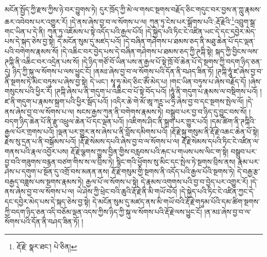 མངོན་སྤྱོད་ཀྱི་རྫས་ཀྱིས་ཉེ་བར་བྱུགས་ཏེ། དུར་ཁྲོད་ཀྱི་མེ་ལ་གསང་སྔགས་བརྗོད་ཅིང་གདུང་བར་བྱས་ན་ཀླུ་རྣམས་ཆར་འབེབས་པར་འགྱུར་རོ། །དེ་ནས་ཞེས་བྱ་བ་ལ་སོགས་པ་ལ། ཀུན་ཏུ་ངེས་པར་སྒྲོགས་པའི་:རྡོ་རྗེའི་\footnote{རྡོ་རྗེ་  སྣར་ཐང་།  པེ་ཅིན། }འབྲུག་སྒྲ་གང་ཡིན་པ་དེ་ནི། ཀུན་ཏུ་འཇོམས་པ་སྟེ་འདོད་པའི་རྒྱལ་པོའོ། །དེ་སྐྱེད་པའི་ཏིང་ངེ་འཛིན་ཡང་དེ་དང་དབྱེར་མེད་པས་དེ་སྐད་ཅེས་བྱ་སྟེ། དེ་མངོན་སུམ་དུ་མཛད་པའོ། །དེ་བཞིན་གཤེགས་པ་ཐམས་ཅད་ནི་མཐུ་ཆེན་པོ་དང་ལྡན་པའི་བགེགས་རྣམས་སོ། །དེ་འཆིང་བར་བྱེད་པས་དེ་བཞིན་གཤེགས་པ་ཐམས་ཅད་ཀྱི་ཊཀྐི་སྟེ། སྐད་ཀྱི་བྱིངས་ལས་ཊཀྐི་ནི་འཆིང་བར་འདྲེན་པས་སོ། །དེ་ཉིད་གཙོ་བོ་ཡིན་པས་ན་རྒྱལ་པོ་སྟེ་ཁྲོ་བོ་ཆེན་པོ་དེ་སྔགས་ཀྱི་བདག་ཉིད་ཅན་དུ། ཉིད་ཀྱི་སྐུ་ལ་སོགས་པ་ལས་ཕྱུང་ངོ། །ནམཿ་ཞེས་བྱ་བ་ལ་སོགས་པའི་དོན་ནི་བཤད་ཟིན་ཏོ། །ཊཀྐི་ཧཱུཾ་ཛ་ཞེས་བྱ་བ་ནི་སྔགས་ཏེ་མིང་བཏུས་པ་ཞེས་བྱ་སྟེ། དེ་ཡང་། སྭཱ་ཧཱ་མེད་ཅིང་ཨོཾ་མེད་པ། །གང་ཡིན་བཏུས་པ་ཞེས་བརྗོད་དོ། །ཞེས་གསུངས་པའི་ཕྱིར་རོ། །ཊཀྐི་ཞེས་པ་ནི་གདུག་པ་འཆིང་བ་པོ་སྟེ་བོད་པའོ། །ཧཱུཾ་ནི་གདུག་པ་རྣམས་ལ་བསྡིགས་པའོ། །ཛ་ནི་གདུག་པ་རྣམས་སྐྲག་པའི་ཕྱིར་སྦོད་པའོ། །འདིར་ཆེ་གེ་མོ་ཨཱ་ཀཪྵ་ཡ་ཧྲི་ཞེས་བྱ་བ་དང་སྔགས་སྤེལ་ལོ། །དེ་ནས་ཞེས་བྱ་བ་ལ་སོགས་པ་ལ། སངས་རྒྱས་ཀུན་ནི་བགེགས་རྣམས་ཏེ། བསྒྲུབ་པར་བྱ་བ་ཉིད་དུ་བྱུང་བས་སོ། །བདག་ཉིད་ཆེན་པོ་ནི་རྫུ་འཕྲུལ་ཆེན་པོ་དང་ལྡན་པའོ། །འཇིགས་ཤིང་ནི་སྐྲག་པར་གྱུར་པའོ། །དམ་ཚིག་ནི་ཊཀྐིའི་རྒྱལ་པོར་གྲགས་པའོ། །ལྡན་པར་གྱུར་ནས་ཞེས་པ་ནི་བློས་དམིགས་པའོ། །རྡོ་རྗེ་སྐུ་གསུམ་ནི་རྡོ་རྗེ་འཆང་ཆེན་པོ་སྟེ། རྗེས་སུ་དྲན་པ་ནི་བསྒོམས་པའོ། །རྡོ་རྗེ་སེམས་དཔའི་ཞེས་བྱ་བ་ལ་སོགས་པ་ལ། རྡོ་རྗེ་སེམས་དཔའི་ཏིང་ངེ་འཛིན་ལ་གནས་པའི་རྣལ་འབྱོར་པས། རྡོ་རྗེ་ལྕགས་ཀྱུས་བྱིན་གྱིས་བརླབས་པའི་རྐང་པ་གཡས་པས་ལིང་ག་སྟེ། བསྒྲུབ་པར་བྱ་བའི་གཟུགས་བརྙན་བཙག་གིས་ས་ལ་བྲིས་ཏེ། སྙིང་གའི་ཕྱོགས་སུ་མིང་དང་སྤེལ་ཏེ་སྔགས་བྲིས་ནས། རྣམ་པར་ཤེས་པ་དགུག་པ་སྔོན་དུ་འགྲོ་བས་མནན་ནས། རྡོ་རྗེ་གསུམ་གྱི་སྔགས་ནི་འདོད་པའི་རྒྱལ་པོའི་སྔགས་ཏེ། དེ་བརྒྱ་རྩ་བརྒྱད་བཟླས་པས་སྔགས་རྣམས་ཏེ། རྒྱལ་པོ་ལ་སོགས་པ་སྟེ། དེ་རྣམས་འགུགས་པའི་བྱ་བ་བྱེད་པར་འགྱུར་རོ། །དེ་ནས་ཞེས་བྱ་བ་ལ་སོགས་པ་ལ། ཡེ་ཤེས་ཀྱི་ཕྲེང་བའི་ཆུའི་རྡོ་རྗེ་ནི་མི་གཡོ་བའོ། །དེ་སྐྱེད་པའི་ཏིང་ངེ་འཛིན་ཀྱང་དེ་དང་དབྱེར་མེད་པས་དེ་སྐད་ཅེས་བྱ་སྟེ། དེ་མངོན་སུམ་དུ་མཛད་ནས་མི་གཡོ་བའི་རྡོ་རྗེ་གཏུམ་པོའི་དམ་ཚིག་སྔགས་ཀྱི་བདག་ཉིད་ཅན་འདི་བཅོམ་ལྡན་འདས་ཀྱིས་ཉིད་ཀྱི་སྐུ་ལ་སོགས་པའི་རྡོ་རྗེ་ལས་ཕྱུང་ངོ། །ན་མཿ་ཞེས་བྱ་བ་ལ་སོགས་པའི་དོན་ནི་བཤད་ཟིན་ཏོ། །
